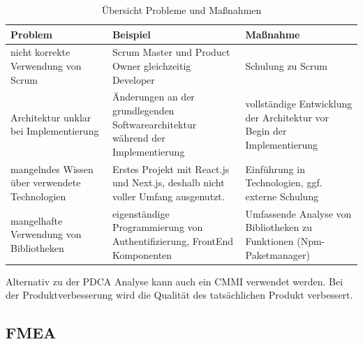 \begin{table}[H]
    \begin{tabular}{l|l|l}
    Problem                                        &Beispiel                                                                         & Maßnahme                                                               \\ \hline
    nicht korrekte Verwendung von Scrum            & Scrum Master und Product Owner gleichzeitig Developer                            & Schulung zu Scrum                                                      \\\hline
    Architektur unklar bei Implementierung         & Änderungen an der grundlegenden Softwarearchitektur während der Implementierung  & vollständige Entwicklung der Architektur vor Begin der Implementierung \\\hline
    mangelndes Wissen über verwendete Technologien & Erstes Projekt mit React.js und Next.js, deshalb nicht voller Umfang ausgenutzt. & Einführung in Technologien, ggf. externe Schulung                      \\\hline
    mangelhafte Verwendung von Bibliotheken        & eigenständige Programmierung von Authentifizierung, FrontEnd Komponenten         & Umfassende Analyse von Bibliotheken zu Funktionen (Npm-Paketmanager)  
    \end{tabular}
    \caption{Übersicht Probleme und Maßnahmen}
    \label{tab:pdca}
\end{table}\noindent
Alternativ zu der PDCA Analyse kann auch ein \ac{CMMI} verwendet werden.
\newparagraph
Bei der Produktverbesserung wird die Qualität des tatsächlichen Produkt verbessert.





% 



\subsection{\acl{FMEA}}





